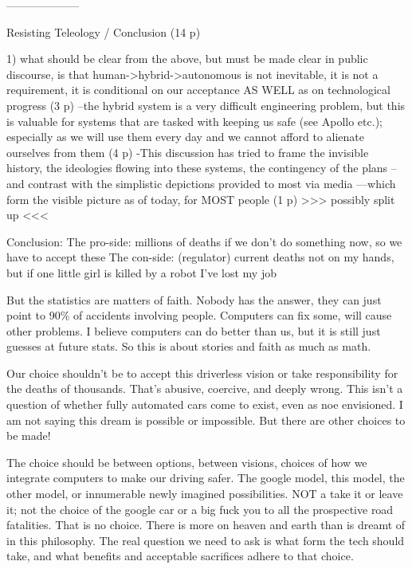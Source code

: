 --------------------

Resisting Teleology / Conclusion (14 p)

1) what should be clear from the above, but must be made clear in
public discourse, is that human->hybrid->autonomous is not inevitable,
it is not a requirement, it is conditional on our acceptance AS WELL
as on technological progress (3 p)
--the hybrid system is a very difficult engineering problem, but this
is valuable for systems that are tasked with keeping us safe (see
Apollo etc.); especially as we will use them every day and we cannot
afford to alienate ourselves from them (4 p)
-This discussion has tried to frame the invisible history, the
ideologies flowing into these systems, the contingency of the plans
--and contrast with the simplistic depictions provided to most via
media
---which form the visible picture as of today, for MOST people (1 p)
>>> possibly split up <<<




Conclusion:
The pro-side: millions of deaths if we don't do something now, so we
have to accept these
The con-side: (regulator) current deaths not on my hands, but if one
little girl is killed by a robot I've lost my job

But the statistics are matters of faith. Nobody has the answer, they
can just point to 90\% of accidents involving people. Computers can fix
                     some, will cause other problems. I believe
                     computers can do better than us, but it is still
                     just guesses at future stats. So this is about
                     stories and faith as much as math.

Our choice shouldn't be to accept this driverless vision or take
responsibility for the deaths of thousands. That's abusive, coercive,
and deeply wrong. This isn't a question of whether fully automated
cars come to exist, even as noe envisioned. I am not saying this dream
is possible or impossible. But there are other choices to be made!

The choice should be between options, between visions, choices of how
we integrate computers to make our driving safer. The google model,
this model, the other model, or innumerable newly imagined
possibilities. NOT a take it or leave it; not the choice of the google
car or a big fuck you to all the prospective road fatalities. That is
no choice. There is more on heaven and earth than is dreamt of in this
philosophy. The real question we need to ask is what form the tech
should take, and what benefits and acceptable sacrifices adhere to
that choice.

